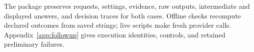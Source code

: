 The package preserves requests, settings, evidence, raw outputs, intermediate and displayed answers, and decision traces for both cases. Offline checks recompute declared outcomes from saved strings; live scripts make fresh provider calls. Appendix~\ref{app:followup} gives execution identities, controls, and retained preliminary failures.
